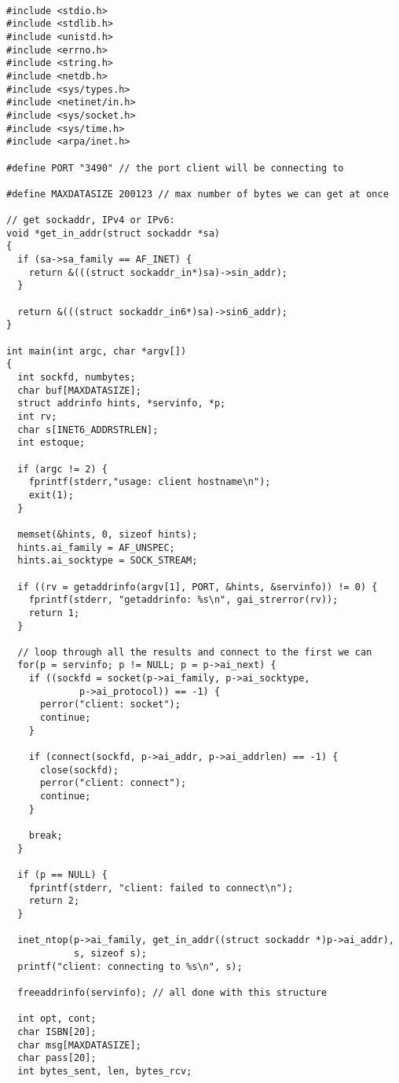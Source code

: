 \documentclass[11pt, brazil]{article} %
\begin{document}
\begin{verbatim}

#include <stdio.h>
#include <stdlib.h>
#include <unistd.h>
#include <errno.h>
#include <string.h>
#include <netdb.h>
#include <sys/types.h>
#include <netinet/in.h>
#include <sys/socket.h>
#include <sys/time.h>
#include <arpa/inet.h>

#define PORT "3490" // the port client will be connecting to 

#define MAXDATASIZE 200123 // max number of bytes we can get at once 

// get sockaddr, IPv4 or IPv6:
void *get_in_addr(struct sockaddr *sa)
{
  if (sa->sa_family == AF_INET) {
    return &(((struct sockaddr_in*)sa)->sin_addr);
  }

  return &(((struct sockaddr_in6*)sa)->sin6_addr);
}

int main(int argc, char *argv[])
{
  int sockfd, numbytes;  
  char buf[MAXDATASIZE];
  struct addrinfo hints, *servinfo, *p;
  int rv;
  char s[INET6_ADDRSTRLEN];
  int estoque;

  if (argc != 2) {
    fprintf(stderr,"usage: client hostname\n");
    exit(1);
  }

  memset(&hints, 0, sizeof hints);
  hints.ai_family = AF_UNSPEC;
  hints.ai_socktype = SOCK_STREAM;

  if ((rv = getaddrinfo(argv[1], PORT, &hints, &servinfo)) != 0) {
    fprintf(stderr, "getaddrinfo: %s\n", gai_strerror(rv));
    return 1;
  }

  // loop through all the results and connect to the first we can
  for(p = servinfo; p != NULL; p = p->ai_next) {
    if ((sockfd = socket(p->ai_family, p->ai_socktype,
			 p->ai_protocol)) == -1) {
      perror("client: socket");
      continue;
    }

    if (connect(sockfd, p->ai_addr, p->ai_addrlen) == -1) {
      close(sockfd);
      perror("client: connect");
      continue;
    }

    break;
  }

  if (p == NULL) {
    fprintf(stderr, "client: failed to connect\n");
    return 2;
  }

  inet_ntop(p->ai_family, get_in_addr((struct sockaddr *)p->ai_addr),
            s, sizeof s);
  printf("client: connecting to %s\n", s);

  freeaddrinfo(servinfo); // all done with this structure
	
  int opt, cont;
  char ISBN[20];
  char msg[MAXDATASIZE];
  char pass[20];
  int bytes_sent, len, bytes_rcv;
	

\end{verbatim}
\end{document}
